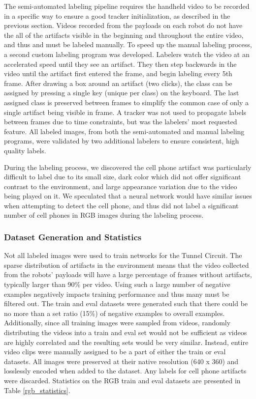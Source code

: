 The semi-automated labeling pipeline requires the handheld video to be recorded in a specific way to ensure a good tracker initialization, as described in the previous section. Videos recorded from the payloads on each robot do not have the all of the artifacts visible in the beginning and throughout the entire video, and thus and must be labeled manually. To speed up the manual labeling process, a second custom labeling program was developed. Labelers watch the video at an accelerated speed until they see an artifact. They then step backwards in the video until the artifact first entered the frame, and begin labeling every 5th frame. After drawing a box around an artifact (two clicks), the class can be assigned by pressing a single key (unique per class) on the keyboard. The last assigned class is preserved between frames to simplify the common case of only a single artifact being visible in frame. A tracker was not used to propagate labels between frames due to time constraints, but was the labelers' most requested feature. All labeled images, from both the semi-automated and manual labeling programs, were validated by two additional labelers to ensure consistent, high quality labels.

During the labeling process, we discovered the cell phone artifact was particularly difficult to label due to its small size, dark color which did not offer significant contrast to the environment, and large appearance variation due to the video being played on it. We speculated that a neural network would have similar issues when attempting to detect the cell phone, and thus did not label a significant number of cell phones in RGB images during the labeling process.

\subsubsection{Dataset Generation and Statistics}

Not all labeled images were used to train networks for the Tunnel Circuit. The sparse distribution of artifacts in the environment means that the video collected from the robots' payloads will have a large percentage of frames without artifacts, typically larger than 90\% per video. Using such a large number of negative examples negatively impacts training performance and thus many must be filtered out. The train and eval datasets were generated such that there could be no more than a set ratio (15\%) of negative examples to overall examples. Additionally, since all training images were sampled from videos, randomly distributing the videos into a train and eval set would not be sufficient as videos are highly correlated and the resulting sets would be very similar. Instead, entire video clips were manually assigned to be a part of either the train or eval datasets. All images were preserved at their native resolution (640 x 360) and losslessly encoded when added to the dataset. Any labels for cell phone artifacts were discarded. Statistics on the RGB train and eval datasets are presented in Table \ref{rgb_statistics}.


